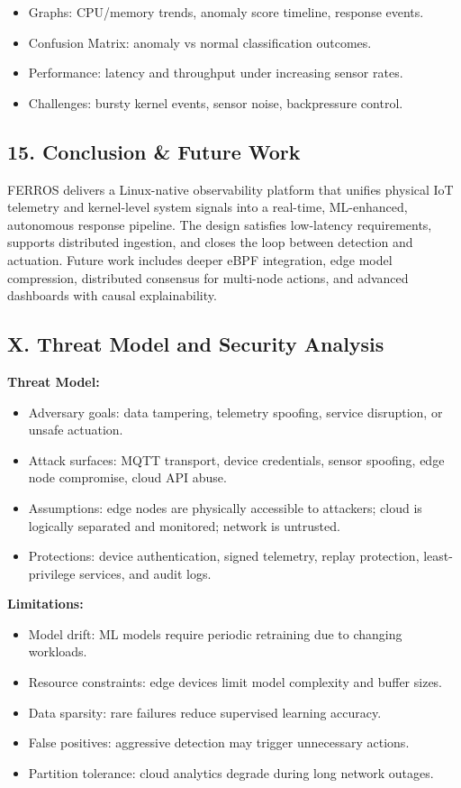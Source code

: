 \documentclass[11pt]{article}
\begin{document}
\begin{itemize}
    \item Graphs: CPU/memory trends, anomaly score timeline, response events.
    \item Confusion Matrix: anomaly vs normal classification outcomes.
    \item Performance: latency and throughput under increasing sensor rates.
    \item Challenges: bursty kernel events, sensor noise, backpressure control.
\end{itemize}

\subsection{15. Conclusion \& Future Work}
FERROS delivers a Linux-native observability platform that unifies physical IoT telemetry and kernel-level system signals into a real-time, ML-enhanced, autonomous response pipeline. The design satisfies low-latency requirements, supports distributed ingestion, and closes the loop between detection and actuation. Future work includes deeper eBPF integration, edge model compression, distributed consensus for multi-node actions, and advanced dashboards with causal explainability.

\subsection{X. Threat Model and Security Analysis}
\textbf{Threat Model:}
\begin{itemize}
    \item Adversary goals: data tampering, telemetry spoofing, service disruption, or unsafe actuation.
    \item Attack surfaces: MQTT transport, device credentials, sensor spoofing, edge node compromise, cloud API abuse.
    \item Assumptions: edge nodes are physically accessible to attackers; cloud is logically separated and monitored; network is untrusted.
    \item Protections: device authentication, signed telemetry, replay protection, least-privilege services, and audit logs.
\end{itemize}

\textbf{Limitations:}
\begin{itemize}
    \item Model drift: ML models require periodic retraining due to changing workloads.
    \item Resource constraints: edge devices limit model complexity and buffer sizes.
    \item Data sparsity: rare failures reduce supervised learning accuracy.
    \item False positives: aggressive detection may trigger unnecessary actions.
    \item Partition tolerance: cloud analytics degrade during long network outages.
\end{itemize}
\end{document}
